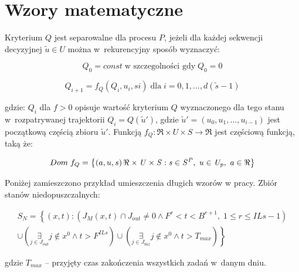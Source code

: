 \section{Wzory matematyczne}

Kryterium $Q$ jest separowalne dla procesu $P$, jeżeli dla każdej sekwencji decyzyjnej $\tilde{u} \in U$ można w~rekurencyjny sposób wyznaczyć:

\begin{equation}
    \label{eq:0001}
    Q_{0}= const\; \text{w szczegolności gdy}\; Q_{0}=0
\end{equation}

\begin{equation}
    \label{eq:0002}
    Q_{i+1}= f_{Q}\left ( Q_{i},u_{i},s{i}\right ) \; \text{dla} \; i=0,1,\dots, d\left ( \tilde{s}-1 \right )
\end{equation}

\noindent gdzie: $Q_{i}$ dla $f>0$ opisuje wartość kryterium $Q$ wyznaczonego dla tego stanu w~rozpatrywanej trajektorii $Q_{i}=Q\left ( {\tilde{u}}' \right )$, gdzie ${\tilde{u}}' = \left (u_{0},u_{1},\dots,u_{i-1}  \right )$ jest początkową częścią zbioru ${\tilde{u}}'$. Funkcją $f_{Q}:\Re \times U \times S \rightarrow \Re$ jest częściową funkcją, taką że:

\begin{equation}
    \label{eq:0003}
    Dom\;f_{Q}=\left \{ \left ( a,u,s \right ) \it \Re \times U \times S: s \in S^{P},\; u \in U_{p}, \; a \in \Re \right \}
\end{equation}

Poniżej zamieszczono przykład umieszczenia długich wzorów w pracy. Zbiór stanów niedopuszczalnych:

\begin{equation}
    \begin{aligned}
        S_{N} = \left\{ \left( x,t \right): \left( J_{M}\left( x,t \right) \cap J_{out} \neq 0 \wedge F^{r} < t < B^{r+1}, \; 1 \leqslant r \leqslant ILs-1 \right) \right. \\
        \left. \cup \left( \underset{j \in J_{out} }{\exists} j \notin x^{0} \wedge t > F^{ILs} \right) \cup \left( \underset{j \in J_{baz} }{\exists} j \notin x^{0} \wedge t > T_{max} \right) \right\}
    \end{aligned}
    \label{eq:0028}
\end{equation}

\noindent gdzie $T_{max}$ -- przyjęty czas zakończenia wszystkich zadań w~danym dniu.

